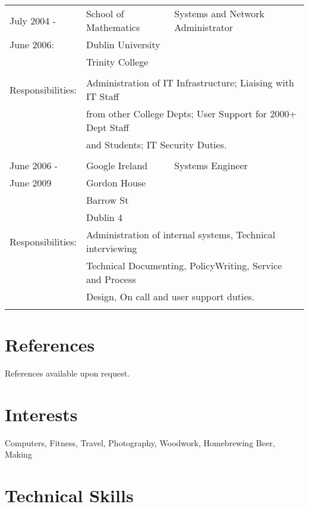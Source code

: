 \documentclass[a4paper, 11pt] {article}
\begin{document}
\begin{tabular}{llll}
July 2004 -			& 	School of Mathematics	&	Systems and Network Administrator &	\\
June 2006:			& 	Dublin University			&	&	\\
						& 	Trinity College			&	&	\\
						& 									&	&	\\
Responsibilities:	& \multicolumn{3}{l}{Administration of IT Infrastructure; Liaising with IT Staff}	\\ 
						& \multicolumn{3}{l}{from other College Depts; User Support for 2000+ Dept Staff}	\\
						& \multicolumn{3}{l}{and Students; IT Security Duties.} 	\\
						& 									&	&	\\
June 2006 - 		&	Google Ireland	&	 Systems Engineer		&	\hspace{10mm}	\\
June 2009  			&	Gordon House	&              &            			\\
      				&	Barrow St		&              &            			\\
      				&	Dublin 4			&              &            			\\
Responsibilities:	& \multicolumn{3}{l}{Administration of internal systems, Technical interviewing} 	\\
						& \multicolumn{3}{l}{Technical Documenting, PolicyWriting, Service and Process}		\\ 
						& \multicolumn{3}{l}{Design, On call and user support duties.} 	\\
      				&              						&  &	\\
\end{tabular}

\section*{References}

References available upon request.

\section*{Interests}

Computers, Fitness, Travel, Photography, Woodwork, Homebrewing Beer, Making

\section*{Technical Skills}
\end{document}
